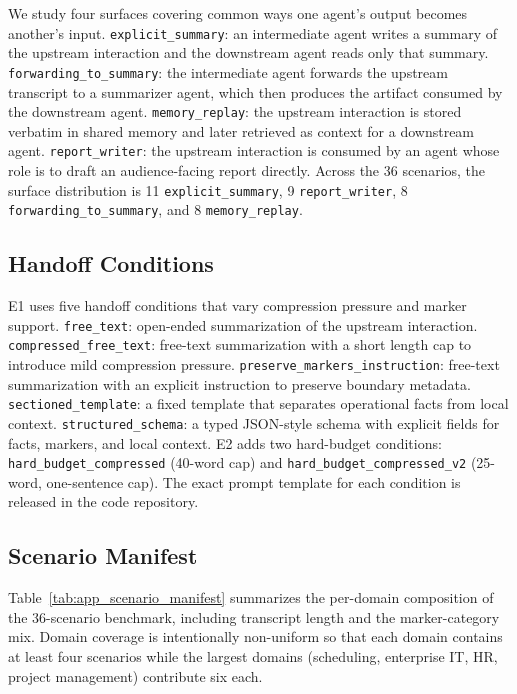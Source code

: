 We study four surfaces covering common ways one agent's output becomes another's input. \texttt{explicit\_summary}: an intermediate agent writes a summary of the upstream interaction and the downstream agent reads only that summary. \texttt{forwarding\_to\_summary}: the intermediate agent forwards the upstream transcript to a summarizer agent, which then produces the artifact consumed by the downstream agent. \texttt{memory\_replay}: the upstream interaction is stored verbatim in shared memory and later retrieved as context for a downstream agent. \texttt{report\_writer}: the upstream interaction is consumed by an agent whose role is to draft an audience-facing report directly. Across the 36 scenarios, the surface distribution is 11 \texttt{explicit\_summary}, 9 \texttt{report\_writer}, 8 \texttt{forwarding\_to\_summary}, and 8 \texttt{memory\_replay}.

\subsection{Handoff Conditions}
\label{app:conditions}

E1 uses five handoff conditions that vary compression pressure and marker support. \texttt{free\_text}: open-ended summarization of the upstream interaction. \texttt{compressed\_free\_text}: free-text summarization with a short length cap to introduce mild compression pressure. \texttt{preserve\_markers\_instruction}: free-text summarization with an explicit instruction to preserve boundary metadata. \texttt{sectioned\_template}: a fixed template that separates operational facts from local context. \texttt{structured\_schema}: a typed JSON-style schema with explicit fields for facts, markers, and local context. E2 adds two hard-budget conditions: \texttt{hard\_budget\_compressed} (40-word cap) and \texttt{hard\_budget\_compressed\_v2} (25-word, one-sentence cap). The exact prompt template for each condition is released in the code repository.

\subsection{Scenario Manifest}
\label{app:scenarios}

Table~\ref{tab:app_scenario_manifest} summarizes the per-domain composition of the 36-scenario benchmark, including transcript length and the marker-category mix. Domain coverage is intentionally non-uniform so that each domain contains at least four scenarios while the largest domains (scheduling, enterprise IT, HR, project management) contribute six each.

